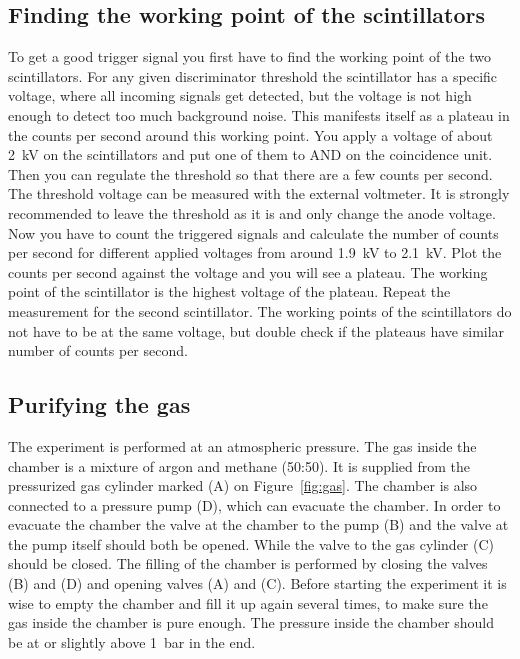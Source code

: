 \documentclass[12pt]{article}
\begin{document}
\subsection{Finding the working point of the scintillators}
To get a good trigger signal you first have to find the working point of the two scintillators. For any given discriminator threshold the scintillator has a specific voltage, where all incoming signals get detected, but the voltage is not high enough to detect too much background noise. This manifests itself as a plateau in the counts per second around this working point. You apply a voltage of about \SI{2}{\kilo\volt} on the scintillators and put one of them to AND on the coincidence unit. Then you can regulate the threshold so that there are a few counts per second. The threshold voltage can be measured with the external voltmeter. It is strongly recommended to leave the threshold as it is and only change the anode voltage. Now you have to count the triggered signals and calculate the number of counts per second for different applied voltages from around \SI{1.9}{\kilo\volt} to \SI{2.1}{\kilo\volt}. Plot the counts per second against the voltage and you will see a plateau. The working point of the scintillator is the highest voltage of the plateau. Repeat the measurement for the second scintillator. The working points of the scintillators do not have to be at the same voltage, but double check if the plateaus have similar number of counts per second.

\subsection{Purifying the gas}
The experiment is performed at an atmospheric pressure. The gas inside the chamber is a mixture of argon and methane (50:50). It is supplied from the pressurized gas cylinder marked (A) on Figure~\ref{fig:gas}. The chamber is also connected to a pressure pump (D), which can evacuate the chamber. In order to evacuate the chamber the valve at the chamber to the pump (B) and the valve at the pump itself should both be opened. While the valve to the gas cylinder (C) should be closed. The filling of the chamber is performed by closing the valves (B) and (D) and opening valves (A) and (C). Before starting the experiment it is wise to empty the chamber and fill it up again several times, to make sure the gas inside the chamber is pure enough. The pressure inside the chamber should be at or slightly above \SI{1}{\bar} in the end.
\end{document}
